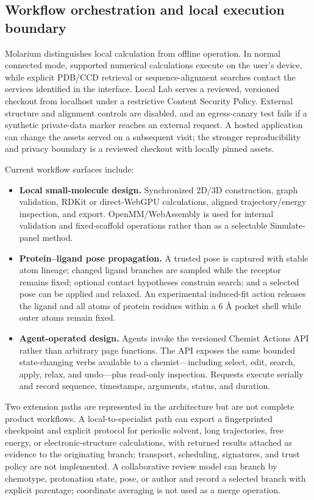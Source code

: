 \documentclass[11pt]{article}
\begin{document}
\begin{small}
\subsection{Workflow orchestration and local execution boundary}

Molarium distinguishes local calculation from offline operation. In normal connected mode, supported numerical calculations execute on the user's device, while explicit PDB/CCD retrieval or sequence-alignment searches contact the services identified in the interface. Local Lab serves a reviewed, versioned checkout from localhost under a restrictive Content Security Policy. External structure and alignment controls are disabled, and an egress-canary test fails if a synthetic private-data marker reaches an external request. A hosted application can change the assets served on a subsequent visit; the stronger reproducibility and privacy boundary is a reviewed checkout with locally pinned assets.

Current workflow surfaces include:

\begin{itemize}[leftmargin=*]
\item \textbf{Local small-molecule design.} Synchronized 2D/3D construction, graph validation, RDKit or direct-WebGPU calculations, aligned trajectory/energy inspection, and export. OpenMM/WebAssembly is used for internal validation and fixed-scaffold operations rather than as a selectable Simulate-panel method.
\item \textbf{Protein--ligand pose propagation.} A trusted pose is captured with stable atom lineage; changed ligand branches are sampled while the receptor remains fixed; optional contact hypotheses constrain search; and a selected pose can be applied and relaxed. An experimental induced-fit action releases the ligand and all atoms of protein residues within a 6 \AA{} pocket shell while outer atoms remain fixed.
\item \textbf{Agent-operated design.} Agents invoke the versioned Chemist Actions API rather than arbitrary page functions. The API exposes the same bounded state-changing verbs available to a chemist---including select, edit, search, apply, relax, and undo---plus read-only inspection. Requests execute serially and record sequence, timestamps, arguments, status, and duration.
\end{itemize}

Two extension paths are represented in the architecture but are not complete product workflows. A local-to-specialist path can export a fingerprinted checkpoint and explicit protocol for periodic solvent, long trajectories, free energy, or electronic-structure calculations, with returned results attached as evidence to the originating branch; transport, scheduling, signatures, and trust policy are not implemented. A collaborative review model can branch by chemotype, protonation state, pose, or author and record a selected branch with explicit parentage; coordinate averaging is not used as a merge operation.


\end{small}
\end{document}
